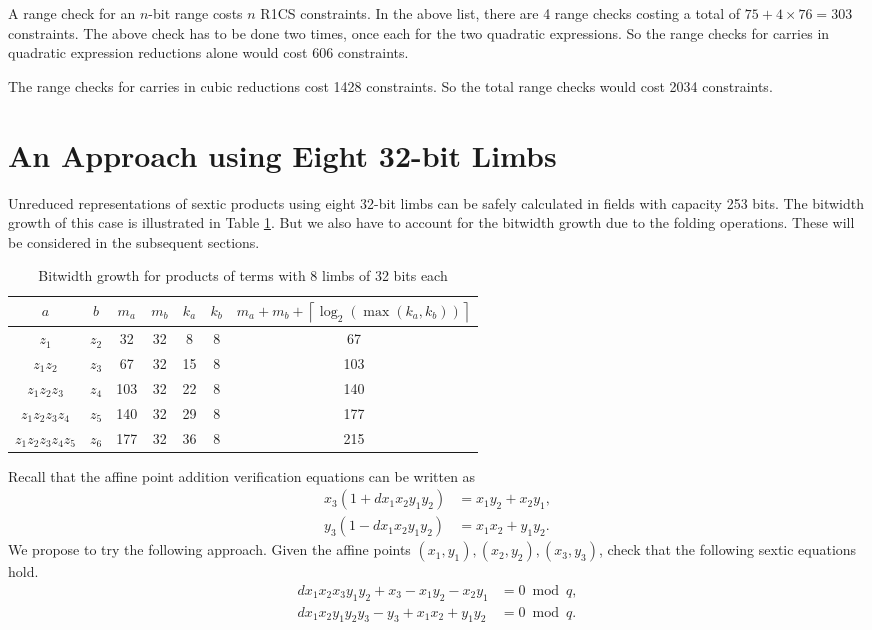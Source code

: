 \documentclass[a4paper, 12pt]{article}
\begin{document}
A range check for an $n$-bit range costs $n$ R1CS constraints. In the above list, there are 4 range checks costing a total of $75 + 4 \times 76 = 303$ constraints. The above check has to be done two times, once each for the two quadratic expressions. So the range checks for carries in quadratic expression reductions alone would cost 606 constraints.

The range checks for carries in cubic reductions cost 1428 constraints. So the total range checks would cost 2034 constraints.
\section{An Approach using Eight 32-bit Limbs}%
\label{sec:an_approach_using_eight_32_bit_limbs}
Unreduced representations of sextic products using eight 32-bit limbs can be safely calculated in fields with capacity 253 bits. The bitwidth growth of this case is illustrated in Table \ref{tab:limb32}. But we also have to account for the bitwidth growth due to the folding operations. These will be considered in the subsequent sections.
\begin{table}[h]
  \centering
  \begin{tabular}{c|c|c|c|c|c|c}
    $a$ & $b$ & $m_a$ & $m_b$ & $k_a$ & $k_b$ & $m_a+m_b+\left\lceil \log_2 \left( \max\left( k_a, k_b \right) \right) \right\rceil$ \\ \hline
    $z_1$ & $z_2$ & 32 & 32 & 8 & 8 & 67 \\ \hline
    $z_1z_2$ & $z_3$ & 67 & 32 & 15 & 8 & 103 \\ \hline
    $z_1z_2z_3$ & $z_4$ & 103 & 32 & 22 & 8 & 140 \\ \hline
    $z_1z_2z_3z_4$ & $z_5$ & 140 & 32 & 29 & 8 & 177 \\ \hline
    $z_1z_2z_3z_4z_5$ & $z_6$ & 177 & 32 & 36 & 8 & 215 \\ \hline
  \end{tabular}
  \caption{Bitwidth growth for products of terms with 8 limbs of 32 bits each}
  \label{tab:limb32}
\end{table}

Recall that the affine point addition verification equations can be written as
\begin{align}
  x_3(1+dx_1x_2y_1y_2) &= x_1y_2 + x_2y_1,\\
  y_3(1-dx_1x_2y_1y_2) &= x_1x_2 + y_1y_2.
  \label{eqn:additionAffineVerificationLimbs8}
\end{align}
We propose to try the following approach. Given the affine points $(x_1, y_1), (x_2, y_2), (x_3, y_3)$, check that the following sextic equations hold.
\begin{align}
  dx_1x_2x_3y_1y_2 + x_3 - x_1y_2 - x_2y_1 &= 0 \bmod q,\label{eqn1}\\
  dx_1x_2y_1y_2y_3 - y_3 + x_1x_2 + y_1y_2 &= 0 \bmod q.\label{eqn2}
\end{align}
\end{document}
